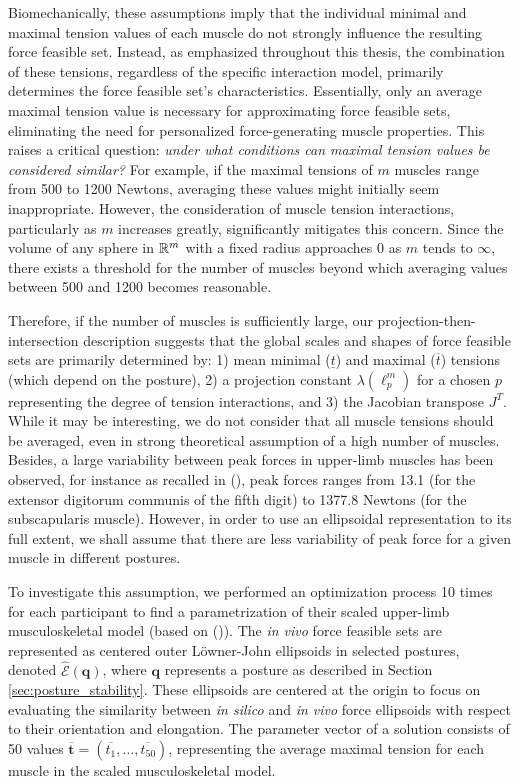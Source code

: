 Biomechanically, these assumptions imply that the individual minimal and maximal tension values of each muscle do not strongly influence the resulting force feasible set. Instead, as emphasized throughout this thesis, the combination of these tensions, regardless of the specific interaction model, primarily determines the force feasible set's characteristics. Essentially, only an average maximal tension value is necessary for approximating force feasible sets, eliminating the need for personalized force-generating muscle properties. This raises a critical question: \emph{under what conditions can maximal tension values be considered similar?} For example, if the maximal tensions of $m$ muscles range from 500 to 1200 Newtons, averaging these values might initially seem inappropriate. However, the consideration of muscle tension interactions, particularly as $m$ increases greatly, significantly mitigates this concern.  Since the volume of any sphere in $\mathbb{R}^m$ with a fixed radius approaches 0 as $m$ tends to $\infty$, there exists a threshold for the number of muscles beyond which averaging values between 500 and 1200 becomes reasonable.

Therefore, if the number of muscles is sufficiently large, our projection-then-intersection description suggests that the global scales and shapes of force feasible sets are primarily determined by: 1) mean minimal ($\underline{t}$) and maximal ($\overline{t}$) tensions (which depend on the posture), 2) a projection constant $\lambda(\ell_p^m)$ for a chosen $p$ representing the degree of tension interactions, and 3) the Jacobian transpose $J^T$. While it may be interesting, we do not consider that all muscle tensions should be averaged, even in strong theoretical assumption of a high number of muscles. Besides, a large variability between peak forces in upper-limb muscles has been observed, for instance as recalled in (\cite{holzbaurModelUpperExtremity2005}), peak forces ranges from 13.1 (for the extensor digitorum communis of the fifth digit) to 1377.8 Newtons (for the subscapularis muscle). However, in order to use an ellipsoidal representation to its full extent, we shall assume that there are less variability of peak force for a given muscle in different postures. 

To investigate this assumption, we performed an optimization process 10 times for each participant to find a parametrization of their scaled upper-limb musculoskeletal model (based on (\cite{holzbaurModelUpperExtremity2005})). The \emph{in vivo} force feasible sets are represented as centered outer Löwner-John ellipsoids in selected postures, denoted $\hat{\mathcal{E}}(\mathbf{q})$, where $\mathbf{q}$ represents a posture as described in Section \ref{sec:posture_stability}. These ellipsoids are centered at the origin to focus on evaluating the similarity between \emph{in silico} and \emph{in vivo} force ellipsoids with respect to their orientation and elongation. The parameter vector of a solution consists of 50 values $\overline{\mathbf{t}} = (\overline{t_1}, \dots, \overline{t_{50}})$, representing the average maximal tension for each muscle in the scaled musculoskeletal model.

